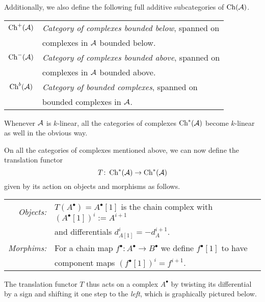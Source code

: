 Additionally, we also define the following full additive subcategories of $\operatorname{Ch}(\mathcal A)$.
\begin{center}
    \begin{tabular}{c l}
        $\operatorname{Ch}^+(\mathcal A)$ & \emph{Category of complexes bounded below}, spanned on \\ &complexes in $\mathcal A$ bounded below. \\
        $\operatorname{Ch}^-(\mathcal A)$ & \emph{Category of complexes bounded above}, spanned on \\ &complexes in $\mathcal A$ bounded above. \\
        $\operatorname{Ch}^b(\mathcal A)$ & \emph{Category of bounded complexes}, spanned on \\ &bounded complexes in $\mathcal A$. \\    
    \end{tabular}
\end{center}
\begin{remark}
    Whenever $\mathcal A$ is $k$-linear, all the categories of complexes $\operatorname{Ch}^*(\mathcal A)$ become $k$-linear as well in the obvious way.
\end{remark}

On all the categories of complexes mentioned above, we can now define the translation functor
\[
    T\colon \operatorname{Ch}^*(\mathcal A) \to \operatorname{Ch}^*(\mathcal A)
\]  
given by its action on objects and morphisms as follows.

\begin{center}
    \begin{tabular}{r l}
        \textsl{Objects:} & $T(A^\bullet) = A^\bullet[1]$ is the chain complex with $(A^\bullet[1])^i := A^{i+1}$ \\ & and differentials $d^i_{A[1]} = - d^{i+1}_{A}$. \\
        \textsl{Morphims:} & For a chain map $f^\bullet\colon A^\bullet \to B^\bullet$ we define $f^\bullet[1]$ to have \\ & component maps $(f^\bullet[1])^i = f^{i+1}$.
    \end{tabular}
\end{center}
The translation functor $T$ thus acts on a complex $A^\bullet$ by twisting its differential by a sign and shifting it one step to the \emph{left}, which is graphically pictured below.

